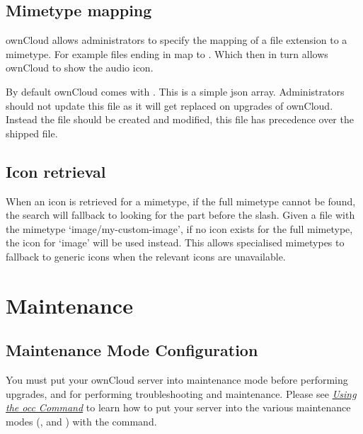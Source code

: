 \documentclass[letterpaper,10pt,english]{sphinxmanual}
\begin{document}
\section{Mimetype mapping}
\label{configuration_mimetypes/mimetype_mapping:mimetype-mapping}\label{configuration_mimetypes/mimetype_mapping::doc}
ownCloud allows administrators to specify the mapping of a file extension to a
mimetype. For example files ending in  map to . Which
then in turn allows ownCloud to show the audio icon.

By default ownCloud comes with . This is a
simple json array.
Administrators should not update this file as it will get replaced on upgrades
of ownCloud. Instead the file  should be created and
modified, this file has precedence over the shipped file.


\section{Icon retrieval}
\label{configuration_mimetypes/index:icon-retrieval}
When an icon is retrieved for a mimetype, if the full mimetype cannot be found,
the search will fallback to looking for the part before the slash. Given a file
with the mimetype `image/my-custom-image', if no icon exists for the full
mimetype, the icon for `image' will be used instead. This allows specialised
mimetypes to fallback to generic icons when the relevant icons are unavailable.


\chapter{Maintenance}
\label{maintenance/index::doc}\label{maintenance/index:maintenance}

\section{Maintenance Mode Configuration}
\label{maintenance/enable_maintenance:maintenance-mode-configuration}\label{maintenance/enable_maintenance::doc}
You must put your ownCloud server into maintenance mode before performing
upgrades, and for performing troubleshooting and maintenance. Please
see {\hyperref[configuration_server/occ_command::doc]{\emph{Using the occ Command}}} to learn how to put your server into
the various maintenance modes (,
and ) with the  command.
\end{document}
